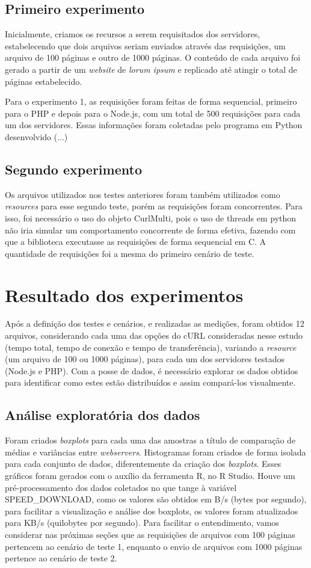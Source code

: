 \documentclass[conference,compsoc]{IEEEtran}
\begin{document}
\subsection{Primeiro experimento}
Inicialmente, criamos os recursos a serem requisitados dos servidores, estabelecendo que dois arquivos seriam enviados através das requisições, um arquivo de 100 páginas e outro de 1000 páginas. O conteúdo de cada arquivo foi gerado a partir de um \textit{website} de \textit{lorum ipsum} \cite{lipsum} e replicado até atingir o total de páginas estabelecido. 

Para o experimento 1, as requisições foram feitas de forma sequencial, primeiro para o PHP e depois para o Node.js, com um total de 500 requisições para cada um dos servidores. Essas informações foram coletadas pelo programa em Python desenvolvido (...)

\subsection{Segundo experimento}
Os arquivos utilizados nos testes anteriores foram também utilizados como  \textit{resources} para esse segundo teste, porém as requisições foram  concorrentes. Para isso, foi necessário o uso do objeto CurlMulti, pois o uso de threads  em python não iria simular um comportamento concorrente de forma efetiva, fazendo com que a biblioteca executasse as requisições de forma sequencial em C. A quantidade de requisições foi a mesma do primeiro cenário de teste.

\section{Resultado dos experimentos}
Após a definição dos testes e cenários, e realizadas as medições, foram obtidos 12 arquivos, considerando cada uma das opções do cURL consideradas nesse estudo (tempo total, tempo de conexão e tempo de transferência), variando a \textit{resource} (um arquivo de 100 ou 1000 páginas), para cada um dos servidores testados (Node.js e PHP). Com a posse de dados, é necessário explorar os dados obtidos para identificar como estes estão distribuídos e assim compará-los visualmente.

\subsection{Análise exploratória dos dados}
Foram criados \textit{boxplots} para cada uma das amostras a título de comparação de médias e variâncias entre \textit{webservers}. Histogramas foram criados de forma isolada para cada conjunto de dados, diferentemente da criação dos \textit{boxplots}. Esses gráficos foram gerados com o auxílio da ferramenta R, no R Studio. Houve um pré-processamento dos dados coletados no que tange à variável SPEED\_DOWNLOAD, como os valores são obtidos em B/s (bytes por segundo), para facilitar a visualização e análise  dos boxplots, os valores foram atualizados para KB/s (quilobytes por segundo). Para facilitar o entendimento, vamos considerar nas próximas seções que as requisições de arquivos com 100 páginas pertencem ao cenário de teste 1, enquanto o envio de arquivos com 1000 páginas pertence ao cenário de teste 2.
\end{document}
